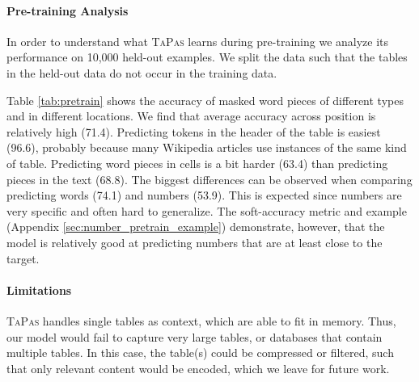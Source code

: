 \documentclass[11pt,a4paper]{article}
\newcommand{\ours}{\textsc{TaPas}\xspace}
\begin{document}
\paragraph{Pre-training Analysis} In order to understand what \ours learns during pre-training we analyze its performance on 10,000 held-out examples. We split the data such that the tables in the held-out data do not occur in the training data.
\begin{table}
\begin{center}
\end{center}
\caption{Mask LM accuracy on held-out data, when the target word piece is located in the text, table header, cell or anywhere (all) and the target is anything, a word or number.}
\label{tab:pretrain}
\end{table}
Table \ref{tab:pretrain} shows the accuracy of masked word pieces 
of different types and in different locations. We find that average accuracy across position is relatively high (71.4).
Predicting tokens in the header of the table is easiest (96.6), probably because many Wikipedia articles use instances of the same
kind of table. Predicting word pieces in cells is a bit harder (63.4) than predicting pieces in the text (68.8). 
The biggest differences can be observed when comparing predicting words (74.1) and numbers (53.9).
This is expected since numbers are very specific and often hard to generalize. The soft-accuracy metric and example (Appendix \ref{sec:number_pretrain_example}) demonstrate, however, that the model is relatively good at predicting numbers that are at least close to the target.

\paragraph{Limitations}

\ours handles single tables as context, which are able to fit in memory. Thus, our model would fail to capture very large tables, or databases that contain multiple tables. In this case, the table(s) could be compressed or filtered, such that only relevant content would be encoded, which we leave for future work.
\end{document}
